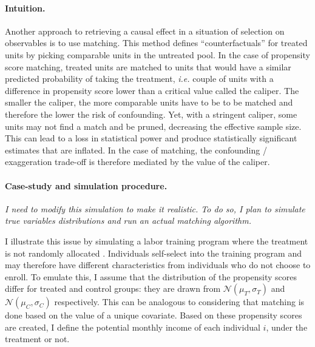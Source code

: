 \documentclass[usletter, 12pt]{article}
\begin{document}
			\paragraph{Intuition.} Another approach to retrieving a causal effect in a situation of selection on observables is to use matching. This method defines ``counterfactuals'' for treated units by picking comparable units in the untreated pool. 
			In the case of propensity score matching, treated units are matched to units that would have a similar predicted probability of taking the treatment, \textit{i.e.} couple of units with a difference in propensity score lower than a critical value called the caliper. The smaller the caliper, the more comparable units have to be to be matched and therefore the lower the risk of confounding. Yet, with a stringent caliper, some units may not find a match and be pruned, decreasing the effective sample size. This can lead to a loss in statistical power and produce statistically significant estimates that are inflated. In the case of matching, the confounding / exaggeration trade-off is therefore mediated by the value of the caliper.
                
       	 	\paragraph{Case-study and simulation procedure.} \textit{I need to modify this simulation to make it realistic. To do so, I plan to simulate true variables distributions and run an actual matching algorithm.}
		
		 I illustrate this issue by simulating a labor training program where the treatment is not randomly allocated \citep{dehejia_causal_1999}. Individuals self-select into the training program and may therefore have different characteristics from individuals who do not choose to enroll. To emulate this, I assume that the distribution of the propensity scores differ for treated and control groups: they are drawn from $\mathcal{N}(\mu_T,\sigma_T)$ and $\mathcal{N}(\mu_C, \sigma_C)$ respectively. This can be analogous to considering that matching is done based on the value of a unique covariate. Based on these propensity scores are created, I define the potential monthly income of each individual $i$, under the treatment or not.%
        
\end{document}

